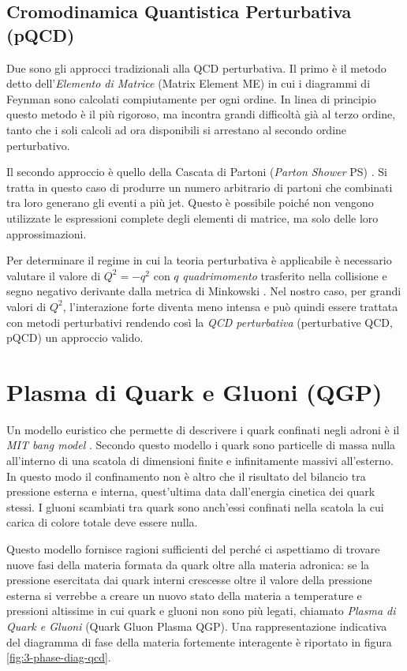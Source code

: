     \subsection{Cromodinamica Quantistica Perturbativa (pQCD)}
        Due sono gli approcci tradizionali alla QCD perturbativa. Il primo è il metodo detto dell'\textit{Elemento di Matrice} (Matrix Element ME) \cite{Vitale_1995} in cui i diagrammi di Feynman sono calcolati compiutamente per ogni ordine. In linea di principio questo metodo è il più rigoroso, ma incontra grandi difficoltà già al terzo ordine, tanto che i soli calcoli ad ora disponibili si arrestano al secondo ordine perturbativo.

        Il secondo approccio è quello della Cascata di Partoni (\textit{Parton Shower} PS) \cite{Bambah_199224}. Si tratta in questo caso di produrre un numero arbitrario di partoni che combinati tra loro generano gli eventi a più jet. Questo è possibile poiché non vengono utilizzate le espressioni complete degli elementi di matrice, ma solo delle loro approssimazioni.

        Per determinare il regime in cui la teoria perturbativa è applicabile è necessario valutare il valore di $Q^2 = - q^2$ con $q$ \textit{quadrimomento} trasferito nella collisione e segno negativo derivante dalla metrica di Minkowski \cite{Altarelli_2004}. Nel nostro caso, per grandi valori di $Q^2$, l'interazione forte diventa meno intensa e può quindi essere trattata con metodi perturbativi rendendo così la \textit{QCD perturbativa} (perturbative QCD, pQCD) un approccio valido.

\section{Plasma di Quark e Gluoni (QGP)}
    Un modello euristico che permette di descrivere i quark confinati negli adroni è il \textit{MIT bang model} \cite{Wong_1994}. Secondo questo modello i quark sono particelle di massa nulla all'interno di una scatola di dimensioni finite e infinitamente massivi all'esterno. In questo modo il confinamento non è altro che il risultato del bilancio tra pressione esterna e interna, quest'ultima data dall'energia cinetica dei quark stessi. I gluoni scambiati tra quark sono anch'essi confinati nella scatola la cui carica di colore totale deve essere nulla.
    
    Questo modello fornisce ragioni sufficienti del perché ci aspettiamo di trovare nuove fasi della materia formata da quark oltre alla materia adronica: se la pressione esercitata dai quark interni crescesse oltre il valore della pressione esterna si verrebbe a creare un nuovo stato della materia a temperature e pressioni altissime in cui quark e gluoni non sono più legati, chiamato \textit{Plasma di Quark e Gluoni} (Quark Gluon Plasma QGP). Una rappresentazione indicativa del diagramma di fase della materia fortemente interagente è riportato in figura \ref{fig:3-phase-diag-qcd}.
    
